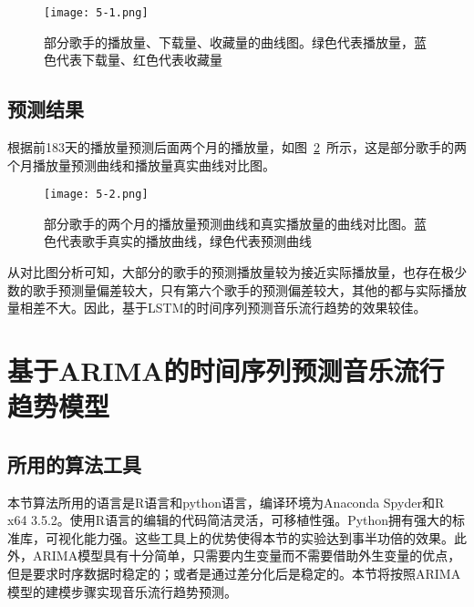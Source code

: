 \begin{figure}[htb]
\centering

\texttt{[image: 5-1.png]}
\caption{部分歌手的播放量、下载量、收藏量的曲线图。绿色代表播放量，蓝色代表下载量、红色代表收藏量}
\label{fig:5-1}
\end{figure}

\subsection{预测结果}
根据前183天的播放量预测后面两个月的播放量，如图~\ref{fig:5-2}~所示，这是部分歌手的两个月播放量预测曲线和播放量真实曲线对比图。

\begin{figure}[htb]
    \centering
\texttt{[image: 5-2.png]}
\caption{部分歌手的两个月的播放量预测曲线和真实播放量的曲线对比图。蓝色代表歌手真实的播放曲线，绿色代表预测曲线}
\label{fig:5-2}
\end{figure}

从对比图分析可知，大部分的歌手的预测播放量较为接近实际播放量，也存在极少数的歌手预测量偏差较大，只有第六个歌手的预测偏差较大，其他的都与实际播放量相差不大。因此，基于LSTM的时间序列预测音乐流行趋势的效果较佳。
\section{基于ARIMA的时间序列预测音乐流行趋势模型}

\subsection{所用的算法工具}
本节算法所用的语言是R语言和python语言，编译环境为Anaconda Spyder和R x64 3.5.2。使用R语言的编辑的代码简洁灵活，可移植性强。Python拥有强大的标准库，可视化能力强。这些工具上的优势使得本节的实验达到事半功倍的效果。此外，ARIMA模型具有十分简单，只需要内生变量而不需要借助外生变量的优点，但是要求时序数据时稳定的；或者是通过差分化后是稳定的。本节将按照ARIMA模型的建模步骤实现音乐流行趋势预测。
